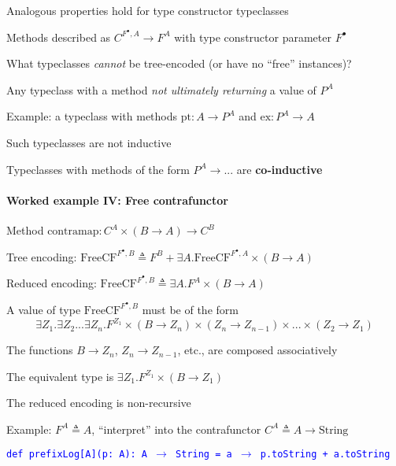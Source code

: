 Analogous properties hold for type constructor typeclasses

Methods described as $C^{F^{\bullet},A}\rightarrow F^{A}$ with type
constructor parameter $F^{\bullet}$

What typeclasses \emph{cannot} be tree-encoded (or have no \textsf{``}free\textsf{''}
instances)?

Any typeclass with a method \emph{not ultimately returning} a value
of $P^{A}$

Example: a typeclass with methods $\text{pt}:A\rightarrow P^{A}$
and $\text{ex}:P^{A}\rightarrow A$

Such typeclasses are not inductive

Typeclasses with methods of the form $P^{A}\rightarrow...$ are \textbf{co-inductive}


\paragraph{Worked example IV: Free contrafunctor}

Method $\text{contramap}:C^{A}\times\left(B\rightarrow A\right)\rightarrow C^{B}$ 

Tree encoding: $\text{FreeCF}^{F^{\bullet},B}\triangleq F^{B}+\exists A.\text{FreeCF}^{F^{\bullet},A}\times\left(B\rightarrow A\right)$

Reduced encoding: $\text{FreeCF}^{F^{\bullet},B}\triangleq\exists A.F^{A}\times\left(B\rightarrow A\right)$ 

A value of type $\text{FreeCF}^{F^{\bullet},B}$ must be of the form
{\footnotesize{}
\[
\exists Z_{1}.\exists Z_{2}...\exists Z_{n}.F^{Z_{1}}\times\left(B\rightarrow Z_{n}\right)\times\left(Z_{n}\rightarrow Z_{n-1}\right)\times...\times\left(Z_{2}\rightarrow Z_{1}\right)
\]
}{\footnotesize\par}

The functions $B\rightarrow Z_{n}$, $Z_{n}\rightarrow Z_{n-1}$,
etc., are composed associatively

The equivalent type is $\exists Z_{1}.F^{Z_{1}}\times\left(B\rightarrow Z_{1}\right)$

The reduced encoding is non-recursive

Example: $F^{A}\triangleq A$, \textsf{``}interpret\textsf{''} into the contrafunctor
$C^{A}\triangleq A\rightarrow\text{String}$

\texttt{\textcolor{blue}{\footnotesize{}def prefixLog{[}A{]}(p: A): A
$\rightarrow$ String = a $\rightarrow$ p.toString + a.toString}}{\footnotesize\par}

